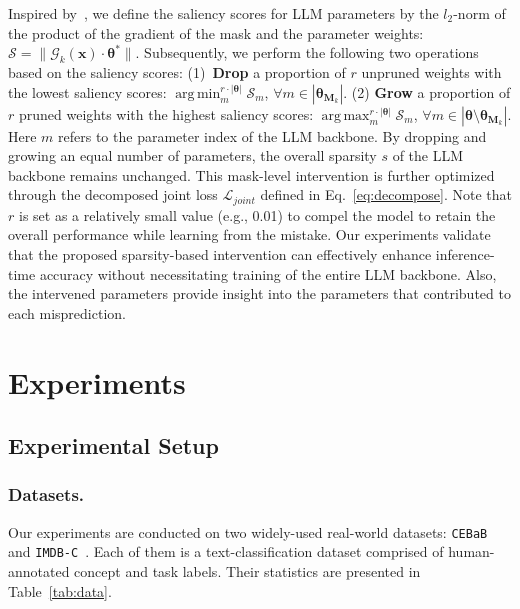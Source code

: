\documentclass[letterpaper]{article} %
\DeclareMathOperator*{\argmax}{arg\,max}
\DeclareMathOperator*{\argmin}{arg\,min}
\begin{document}
Inspired by~\citet{evci2020rigging,sun2023simple}, we define the saliency scores for LLM parameters by the $l_2$-norm of the product of the gradient of the mask and the parameter weights: $\mathcal{S} = \|\mathcal{G}_k(\bm{x}) \cdot \bm{\theta}^\ast \|$. Subsequently, we perform the following two operations based on the saliency scores: (1)~\textbf{Drop} a proportion of $r$ unpruned weights with the lowest saliency scores: $\argmin_m^{r\cdot |\bm{\theta}|} \mathcal{S}_m$, $\forall m \in |\bm{\theta}_{\bm{M}_k}|$. (2) \textbf{Grow} a proportion of $r$ pruned weights with the highest saliency scores: $\argmax_m^{r\cdot |\bm{\theta}|} \mathcal{S}_m$, $\forall m \in |\bm{\theta} \setminus \bm{\theta}_{\bm{M}_k}|$. Here $m$ refers to the parameter index of the LLM backbone. By dropping and growing an equal number of parameters, the overall sparsity $s$ of the LLM backbone remains unchanged. This mask-level intervention is further optimized through the decomposed joint loss $\mathcal{L}_{joint}$ defined in Eq.~\eqref{eq:decompose}. Note that $r$ is set as a relatively small value (e.g., 0.01) to compel the model to retain the overall performance while learning from the mistake. Our experiments validate that the proposed sparsity-based intervention can effectively enhance inference-time accuracy without necessitating training of the entire LLM backbone. Also, the intervened parameters provide insight into the parameters that contributed to each misprediction.





\section{Experiments}
\subsection{Experimental Setup}
\subsubsection{Datasets.} Our experiments are conducted on two widely-used real-world datasets: \texttt{CEBaB}~\citep{abraham2022cebab} and \texttt{IMDB-C}~\cite{tan2023cbm}. Each of them is a text-classification dataset comprised of human-annotated concept and task labels. Their statistics are presented in Table~\ref{tab:data}.
\end{document}
